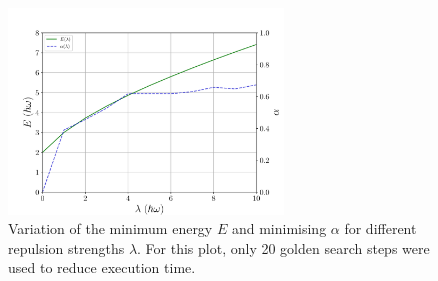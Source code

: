 \documentclass[a4paper,DIV=12,english]{scrartcl}
\begin{document}
\begin{figure}
    \centering
    \includegraphics[width=0.65\textwidth]{../plots/sweep.pdf}
    \caption{Variation of the minimum energy $E$ and minimising $\alpha$ for different repulsion strengths $\lambda$. For this plot, only 20 golden search steps were used to reduce execution time.}
    \label{fig:sweep}
\end{figure}
\end{document}
